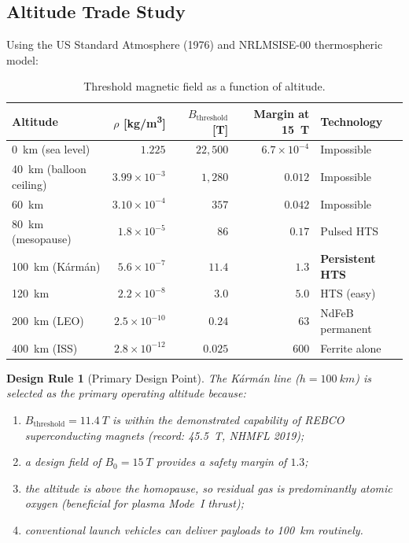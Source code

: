 \documentclass[11pt,a4paper]{article}
\newtheorem{designrule}{Design Rule}
\begin{document}
\subsection{Altitude Trade Study}

Using the US Standard Atmosphere (1976) and NRLMSISE-00 thermospheric model:

\begin{table}[h]
\centering
\caption{Threshold magnetic field as a function of altitude.}
\label{tab:altitude_trade}
\begin{tabular}{@{}lrrrl@{}}
\toprule
Altitude & $\rho$ [\si{kg/m^3}] & $B_{\mathrm{threshold}}$ [\si{T}] & Margin at \SI{15}{T} & Technology \\
\midrule
\SI{0}{km} (sea level) & $1.225$ & $22{,}500$ & $6.7\times 10^{-4}$ & Impossible \\
\SI{40}{km} (balloon ceiling) & $3.99 \times 10^{-3}$ & $1{,}280$ & $0.012$ & Impossible \\
\SI{60}{km} & $3.10 \times 10^{-4}$ & $357$ & $0.042$ & Impossible \\
\SI{80}{km} (mesopause) & $1.8 \times 10^{-5}$ & $86$ & $0.17$ & Pulsed HTS \\
\SI{100}{km} (K\'arm\'an) & $5.6 \times 10^{-7}$ & $11.4$ & $\mathbf{1.3}$ & \textbf{Persistent HTS} \\
\SI{120}{km} & $2.2 \times 10^{-8}$ & $3.0$ & $5.0$ & HTS (easy) \\
\SI{200}{km} (LEO) & $2.5 \times 10^{-10}$ & $0.24$ & $63$ & NdFeB permanent \\
\SI{400}{km} (ISS) & $2.8 \times 10^{-12}$ & $0.025$ & $600$ & Ferrite alone \\
\bottomrule
\end{tabular}
\end{table}

\begin{designrule}[Primary Design Point]
The K\'arm\'an line ($h = \SI{100}{km}$) is selected as the primary operating
altitude because:
\begin{enumerate}[nosep]
\item $B_{\mathrm{threshold}} = \SI{11.4}{T}$ is within the demonstrated
capability of REBCO superconducting magnets (record: \SI{45.5}{T}, NHMFL 2019);
\item a design field of $B_0 = \SI{15}{T}$ provides a safety margin of $1.3$;
\item the altitude is above the homopause, so residual gas is predominantly
atomic oxygen (beneficial for plasma Mode~I thrust);
\item conventional launch vehicles can deliver payloads to \SI{100}{km} routinely.
\end{enumerate}
\end{designrule}
\end{document}
